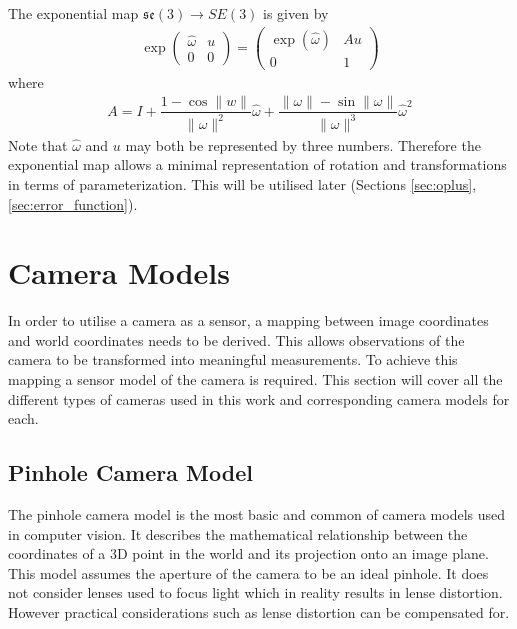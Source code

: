 The exponential map $\mathfrak{se}(3) \to SE(3)$ is given by
\begin{align}
 \exp\left(\begin{array}{cc}
             \hat\omega & u \\
             0 & 0  
           \end{array} \right) 
=
  \left(\begin{array}{cc}
          \exp(\hat\omega) & Au \\
          0 & 1 
        \end{array} \right)
\end{align}
where
\begin{align}
 A = I + \dfrac{1 - \cos\|w\|}{\|\omega\|^2}\hat\omega 
          + \dfrac{\|\omega\| - \sin\|\omega\|}
                  {\|\omega\|^3}\hat\omega^2
\end{align}
Note that $\hat\omega$ and $u$ may both be represented by three numbers.  Therefore the exponential map allows a minimal representation of rotation and transformations in terms of parameterization.  This will be utilised later (Sections \ref{sec:oplus}, \ref{sec:error_function}).

\section{Camera Models}
\label{sec:camera_models}
In order to utilise a camera as a sensor, a mapping between image coordinates and world coordinates needs to be derived.  This allows observations of the camera to be transformed into meaningful measurements.  To achieve this mapping a sensor model of the camera is required. This section will cover all the different types of cameras used in this work and corresponding camera models for each. 

\subsection{Pinhole Camera Model}
\label{subsec:pinhole_cam}


The pinhole camera model is the most basic and common of camera models used in computer vision.  It describes the mathematical relationship between the coordinates of a 3D point in the world and its projection onto an image plane.  This model assumes the aperture of the camera to be an ideal pinhole. It does not consider lenses used to focus light which in reality results in lense distortion.  However practical considerations such as lense distortion can be compensated for.


